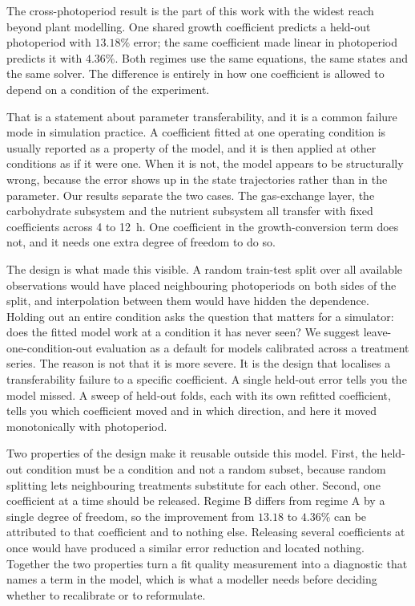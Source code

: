 The cross-photoperiod result is the part of this work with the widest reach
beyond plant modelling. One shared growth coefficient predicts a held-out
photoperiod with $13.18\%$ error; the same coefficient made linear in
photoperiod predicts it with $4.36\%$. Both regimes use the same equations, the
same states and the same solver. The difference is entirely in how one
coefficient is allowed to depend on a condition of the experiment.

That is a statement about parameter transferability, and it is a common failure
mode in simulation practice. A coefficient fitted at one operating condition is
usually reported as a property of the model, and it is then applied at other
conditions as if it were one. When it is not, the model appears to be
structurally wrong, because the error shows up in the state trajectories rather
than in the parameter. Our results separate the two cases. The gas-exchange
layer, the carbohydrate subsystem and the nutrient subsystem all transfer with
fixed coefficients across 4 to 12~h. One coefficient in the growth-conversion
term does not, and it needs one extra degree of freedom to do so.

The design is what made this visible. A random train-test split over all
available observations would have placed neighbouring photoperiods on both
sides of the split, and interpolation between them would have hidden the
dependence. Holding out an entire condition asks the question that matters for
a simulator: does the fitted model work at a condition it has never seen? We
suggest leave-one-condition-out evaluation as a default for models calibrated
across a treatment series. The reason is not that it is more severe. It is the
design that localises a transferability failure to a specific coefficient. A
single held-out error tells you the model missed. A
sweep of held-out folds, each with its own refitted coefficient, tells you
which coefficient moved and in which direction, and here it moved monotonically
with photoperiod.

Two properties of the design make it reusable outside this model. First, the
held-out condition must be a condition and not a random subset, because random
splitting lets neighbouring treatments substitute for each other. Second, one
coefficient at a time should be released. Regime B differs from regime A by a
single degree of freedom, so the improvement from $13.18$ to $4.36\%$ can be
attributed to that coefficient and to nothing else. Releasing several
coefficients at once would have produced a similar error reduction and located
nothing. Together the two properties turn a fit quality measurement into a
diagnostic that names a term in the model, which is what a modeller needs before
deciding whether to recalibrate or to reformulate.

